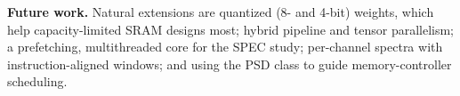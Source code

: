 \documentclass[12pt]{article}
\begin{document}
\textbf{Future work.} Natural extensions are quantized (8- and 4-bit) weights, which help capacity-limited SRAM designs most; hybrid pipeline and tensor parallelism; a prefetching, multithreaded core for the SPEC study; per-channel spectra with instruction-aligned windows; and using the PSD class to guide memory-controller scheduling.
\newpage


\end{document}

